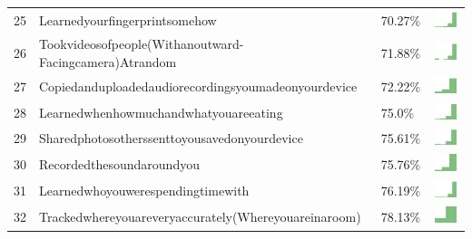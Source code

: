 \documentclass[a4paper,12pt]{article}
\begin{document}
\begin{longtable}{| p{0.5cm} | p{7cm} | p{1cm} | c |}
25 & Learnedyourfingerprintsomehow & 70.27\% & \includegraphics[width = 2cm, height = 0.5cm]{learnedyourfingerprintsomehowWORKCONTACTS} \\  
26 & Tookvideosofpeople(Withanoutward-Facingcamera)Atrandom & 71.88\% & \includegraphics[width = 2cm, height = 0.5cm]{tookvideosofpeople(withanoutward-facingcamera)atrandomWORKCONTACTS} \\  
27 & Copiedanduploadedaudiorecordingsyoumadeonyourdevice & 72.22\% & \includegraphics[width = 2cm, height = 0.5cm]{copiedanduploadedaudiorecordingsyoumadeonyourdeviceWORKCONTACTS} \\  
28 & Learnedwhenhowmuchandwhatyouareeating & 75.0\% & \includegraphics[width = 2cm, height = 0.5cm]{learnedwhenhowmuchandwhatyouareeatingWORKCONTACTS} \\  
29 & Sharedphotosotherssenttoyousavedonyourdevice & 75.61\% & \includegraphics[width = 2cm, height = 0.5cm]{sharedphotosotherssenttoyousavedonyourdeviceWORKCONTACTS} \\  
30 & Recordedthesoundaroundyou & 75.76\% & \includegraphics[width = 2cm, height = 0.5cm]{recordedthesoundaroundyouWORKCONTACTS} \\  
31 & Learnedwhoyouwerespendingtimewith & 76.19\% & \includegraphics[width = 2cm, height = 0.5cm]{learnedwhoyouwerespendingtimewithWORKCONTACTS} \\  
32 & Trackedwhereyouareveryaccurately(Whereyouareinaroom) & 78.13\% & \includegraphics[width = 2cm, height = 0.5cm]{trackedwhereyouareveryaccurately(whereyouareinaroom)WORKCONTACTS} \\  

\end{longtable}
\end{document}
